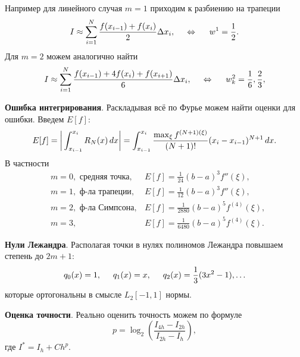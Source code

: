 Например для линейного случая $m=1$ приходим к разбиению на трапеции
\begin{equation*}
	I \approx \sum_{i=1}^{N} \frac{f(x_{i-1})+f(x_i)}{2} \Delta x_i,
	\hspace{5 mm} \Leftrightarrow \hspace{5 mm} 
	w^1 = \frac{1}{2}.
\end{equation*}
Для $m=2$ можем аналогично найти
\begin{equation*}
	I \approx \sum_{i=1}^{N} \frac{f(x_{i-1}) + 4 f(x_i) + f(x_{i+1})}{6} \Delta x_i,
	\hspace{0.5cm} \Leftrightarrow \hspace{0.5cm}
	w_k^2 = \frac{1}{6}, \frac{2}{3},
\end{equation*}



\textbf{Ошибка интегрирования}. Раскладывая всё по Фурье можем найти оценки для ошибки. Введем $E[f]$:
\begin{equation*}
	E[f] = \bigg|
		\int_{x_{i-1}}^{x_i} R_N (x) \, d x
	\bigg| = \int_{x_{i-1}}^{x_i} \frac{\max_\xi f^{(N+1) (\xi)}}{(N+1)!} (x_i - x_{i-1})^{N+1} \, d x.
\end{equation*}
В частности
\begin{align*}
	&m=0, \text{ средняя точка}, &E[f] = \frac{1}{24}(b-a)^3 f''(\xi), \\
	&m=1, \text{ ф-ла трапеции}, &E[f] = \frac{1}{12}(b-a)^3 f''(\xi), \\
	&m=2, \text{ ф-ла Симпсона}, &E[f] = \frac{1}{2880} (b-a)^5 f^{(4)}(\xi), \\
	&m=3, &E[f] = \frac{1}{6480} (b-a)^5 f^{(4)}(\xi).
\end{align*}



\textbf{Нули Лежандра}. Располагая точки в нулях полиномов Лежандра повышаем степень до $2m+1$:
\begin{equation*}
	q_0 (x) = 1,
	\hspace{5 mm} 
	q_1 (x) = x,
	\hspace{5 mm} 
	q_2(x) = \frac{1}{3}(3x^2-1), \ldots
\end{equation*}
которые ортогональны в смысле $L_2[-1, 1]$ нормы.


\textbf{Оценка точности}. Реально оценить точность можем по формуле
\begin{equation*}
	p = \log_2 \left(
		\frac{I_{4h}-I_{2h}}{I_{2h}-I_h}
	\right),
\end{equation*}
где $I^* = I_h + C h^p$.